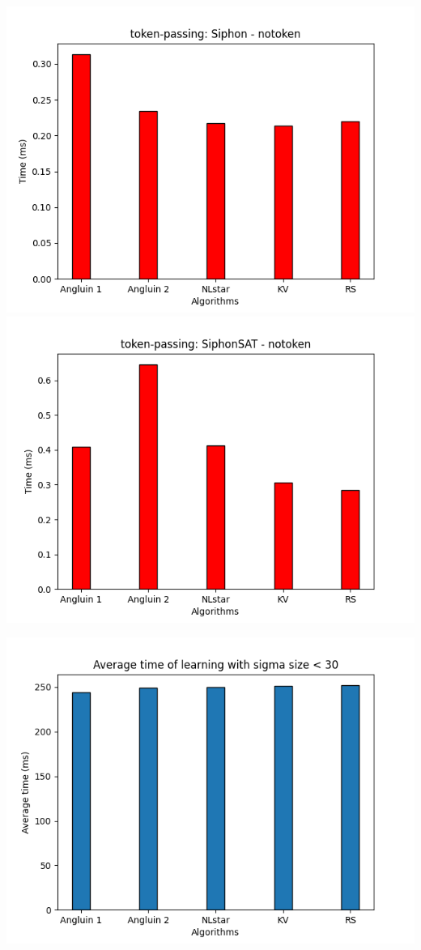 \includegraphics[scale=0.5]{figures/Siphon_notoken.png}
\includegraphics[scale=0.5]{figures/SiphonSAT_notoken.png}


\includegraphics[scale=0.75]{figures/average_time2.png}

